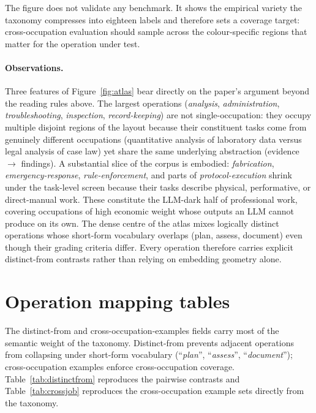 \documentclass{article}
\begin{document}
The figure does not validate any benchmark.
It shows the empirical variety the taxonomy compresses into eighteen labels and therefore sets a coverage target: cross-occupation evaluation should sample across the colour-specific regions that matter for the operation under test.

\paragraph{Observations.} Three features of Figure~\ref{fig:atlas} bear directly on the paper's argument beyond the reading rules above.
The largest operations (\emph{analysis}, \emph{administration}, \emph{troubleshooting}, \emph{inspection}, \emph{record-keeping}) are not single-occupation: they occupy multiple disjoint regions of the layout because their constituent tasks come from genuinely different occupations (quantitative analysis of laboratory data versus legal analysis of case law) yet share the same underlying abstraction (evidence $\to$ findings).
A substantial slice of the corpus is embodied: \emph{fabrication}, \emph{emergency-response}, \emph{rule-enforcement}, and parts of \emph{protocol-execution} shrink under the task-level screen because their tasks describe physical, performative, or direct-manual work.
These constitute the LLM-dark half of professional work, covering occupations of high economic weight whose outputs an LLM cannot produce on its own.
The dense centre of the atlas mixes logically distinct operations whose short-form vocabulary overlaps (plan, assess, document) even though their grading criteria differ.
Every operation therefore carries explicit distinct-from contrasts rather than relying on embedding geometry alone.

\section{Operation mapping tables}
\label{app:mapping}

The distinct-from and cross-occupation-examples fields carry most of the semantic weight of the taxonomy.
Distinct-from prevents adjacent operations from collapsing under short-form vocabulary (``\emph{plan}'', ``\emph{assess}'', ``\emph{document}''); cross-occupation examples enforce cross-occupation coverage.
Table~\ref{tab:distinctfrom} reproduces the pairwise contrasts and Table~\ref{tab:crossjob} reproduces the cross-occupation example sets directly from the taxonomy.


\end{document}
